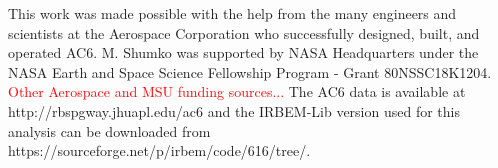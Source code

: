 \documentclass[draft]{agujournal2019}
\begin{document}
%
%
%
%
%
%
%
%


\acknowledgments
This work was made possible with the help from the many engineers and scientists at the Aerospace Corporation who successfully designed, built, and operated AC6. M. Shumko was supported by NASA Headquarters under the NASA Earth and Space Science Fellowship Program - Grant 80NSSC18K1204. \textcolor{red}{Other Aerospace and MSU funding sources...} The AC6 data is available at http://rbspgway.jhuapl.edu/ac6 and the IRBEM-Lib version used for this analysis can be downloaded from https://sourceforge.net/p/irbem/code/616/tree/.


%
%



%
%
%
%
%
\end{document}
